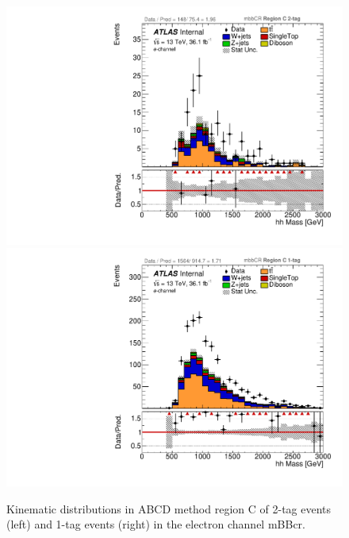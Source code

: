 \begin{figure}[!htbp]
\begin{center}
\includegraphics[scale=0.23]{./figures/boosted/ABCD/elec_mbbcr_RegionC_hhMass}
\includegraphics[scale=0.23]{./figures/boosted/ABCD/elec_mbbcr_RegionC_1tag_hhMass}
\caption{Kinematic distributions in ABCD method region C of 2-tag events (left) and 1-tag events (right) in the electron channel mBBcr.}
\label{fig:boosted_abcd_region_c_mbbcr_elec}
\end{center}
\end{figure}


